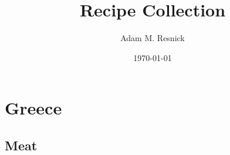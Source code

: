 \documentclass[14pt]{report}
\title{\bf{Recipe Collection}}
\author{Adam M. Resnick}
\date{\today}
\DeclareRobustCommand{\textfar}{\ensuremath{^{\circ}\mathrm{F}}}
\begin{document}
\maketitle

\tableofcontents

\begin{comment}
\begin{recipe}[%
    preparationtime = {\unit[30]{min}},
    bakingtime={\unit[1]{h}},
    bakingtemperature={\protect\bakingtemperature{
        fanoven=\unit[230]{\textfar},
        topbottomheat=\unit[195]{°C},
        topheat=\unit[195]{°C},
        gasstove=Level 2}},
    portion = {\portion{5-6}},
    calory={\unit[3]{kJ}},
    source = {Somebody you used know}
]
{Test Recipe}

    \introduction{
        \blindtext
    }

    \ingredients{
        2 bar & Dark Chocolate (above \unit[70]{\%})\\
        3 & Eggs\\
        \unit[200]{ml} & Cream\\
        40 g & Sugar\\
        50 g & Butter
    }

    \preparation{
        \step \blindtext
        \step \blindtext
        \step \blindtext
    }

    \suggestion[Headline]{
        \blindtext
    }

    \suggestion{
        \blindtext
    }

    \hint{
        Enjoy typesetting recipes with {\textbf{\Large\LaTeX}} and {\textbf{\Large xcookybooky!}}
    }

\end{recipe}
\end{comment}

\chapter {Greece}

\section{Meat}
\end{document}
